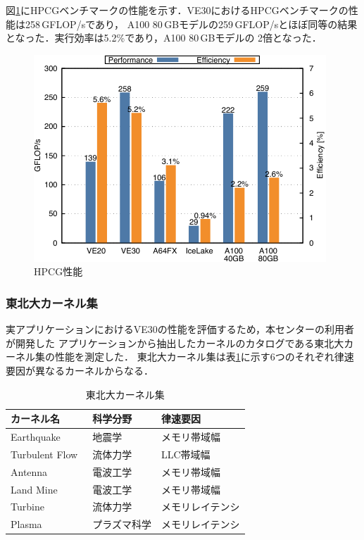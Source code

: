 ﻿\documentclass[submit,techrep,noauthor]{ipsj}
\begin{document}
図\ref{fig:hpcg}にHPCGベンチマークの性能を示す．VE30におけるHPCGベンチマークの性能は258\,GFLOP/sであり，
A100 80\,GBモデルの259\,GFLOP/sとほぼ同等の結果となった．実行効率は5.2\%であり，A100 80\,GBモデルの
2倍となった．

\begin{figure}[tb]
  \centering
  \includegraphics{figs/hpcg.pdf}
  \caption{HPCG性能~\cite{Takahashi2023}}\label{fig:hpcg}
\end{figure}

\subsubsection{東北大カーネル集}

実アプリケーションにおけるVE30の性能を評価するため，本センターの利用者が開発した
アプリケーションから抽出したカーネルのカタログである東北大カーネル集の性能を測定した．
東北大カーネル集は表\ref{tbl:isc-kernels}に示す6つのそれぞれ律速要因が異なるカーネルからなる．

\begin{table}[tb]
\centering
\caption{東北大カーネル集}\label{tbl:isc-kernels}
\begin{tabular}{@{}lll@{}}
\toprule
カーネル名                          & 科学分野        & 律速要因            \\ \midrule
Earthquake~\cite{Ariyoshi2007}      & 地震学          & メモリ帯域幅        \\
Turbulent Flow~\cite{Tsukahara2007} & 流体力学        & LLC帯域幅           \\
Antenna~\cite{Sato2011}             & 電波工学        & メモリ帯域幅        \\
Land Mine~\cite{Sato2003}           & 電波工学        & メモリ帯域幅        \\
Turbine~\cite{Tsukahara2007}        & 流体力学        & メモリレイテンシ    \\
Plasma~\cite{Katoh2005}             & プラズマ科学    & メモリレイテンシ    \\ \bottomrule
\end{tabular}
\end{table}
\end{document}
